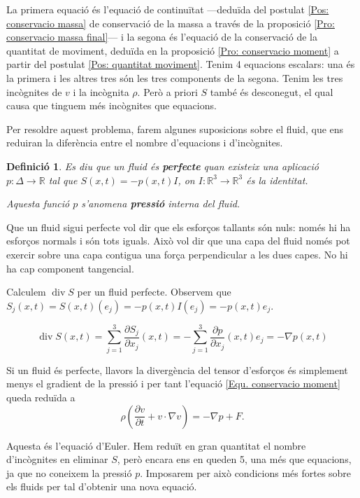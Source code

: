 \documentclass{article}
\numberwithin{equation}{section}
\DeclareMathOperator{\diver}{div}
\newtheorem{definicio}{Definici\'{o}}[section]
\begin{document}
La primera equaci\'{o} \'{e}s l'equaci\'{o} de continu\"{i}tat ---dedu\"{i}da del postulat \ref{Pos: conservacio massa} de conservaci\'{o} de la massa a trav\'{e}s de la proposici\'{o} \ref{Pro: conservacio massa final}--- i la segona \'{e}s l'equaci\'{o} de la conservaci\'{o} de la quantitat de moviment, dedu\"{i}da en la proposici\'{o} \ref{Pro: conservacio moment} a partir del postulat \ref{Pos: quantitat moviment}. Tenim 4 equacions escalars: una \'{e}s la primera i les altres tres s\'{o}n les tres components de la segona. Tenim les tres inc\`{o}gnites de $v$ i la inc\`{o}gnita $\rho$. Per\`{o} a priori $S$ tamb\'{e} \'{e}s desconegut, el qual causa que tinguem m\'{e}s inc\`{o}gnites que equacions.

Per resoldre aquest problema, farem algunes suposicions sobre el fluid, que ens reduiran la difer\`{e}ncia entre el nombre d'equacions i d'inc\`{o}gnites.

\begin{definicio}
Es diu que un fluid \'{e}s \textbf{perfecte} quan existeix una aplicaci\'{o} $p:\Delta\rightarrow\mathbb{R}$ tal que $S(x,t)=-p(x,t)I$, on $I:\mathbb{R}^3\rightarrow\mathbb{R}^3$ \'{e}s la identitat.

Aquesta funci\'{o} $p$ s'anomena \textbf{pressi\'{o}} interna del fluid.
\end{definicio}

Que un fluid sigui perfecte vol dir que els esfor\c{c}os tallants s\'{o}n nuls: nom\'{e}s hi ha esfor\c{c}os normals i s\'{o}n tots iguals. Aix\`{o} vol dir que una capa del fluid nom\'{e}s pot exercir sobre una capa contigua una for\c{c}a perpendicular a les dues capes. No hi ha cap component tangencial.

Calculem $\diver S$ per un fluid perfecte. Observem que $S_j(x,t)=S(x,t)(e_j)=-p(x,t)I(e_j)=-p(x,t)e_j$.

\[\diver S(x,t)=\sum_{j=1}^3\frac{\partial S_j}{\partial x_j}(x,t)=-\sum_{j=1}^3\frac{\partial p}{\partial x_j}(x,t)e_j=-\nabla p(x,t)\]

Si un fluid \'{e}s perfecte, llavors la diverg\`{e}ncia del tensor d'esfor\c{c}os \'{e}s simplement menys el gradient de la pressi\'{o} i per tant l'equaci\'{o} \ref{Equ. conservacio moment} queda redu\"{i}da a
\begin{equation}\label{Equ. Euler perfecte}
\rho\left(\frac{\partial v}{\partial t}+v\cdot\nabla v\right)=-\nabla p+F.
\end{equation}

Aquesta \'{e}s l'equaci\'{o} d'Euler. Hem redu\"{i}t en gran quantitat el nombre d'inc\`{o}gnites en eliminar $S$, per\`{o} encara ens en queden 5, una m\'{e}s que equacions, ja que no coneixem la pressi\'{o} $p$. Imposarem per aix\`{o} condicions m\'{e}s fortes sobre els fluids per tal d'obtenir una nova equaci\'{o}.
\end{document}
